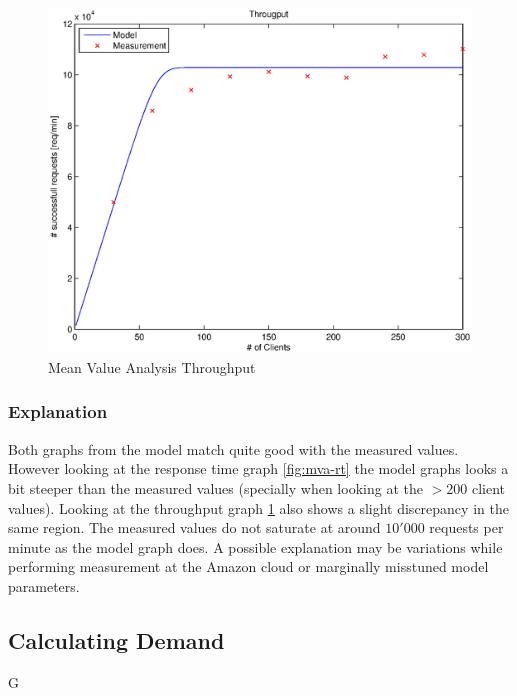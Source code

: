\documentclass[a4paper]{article}
\begin{document}
\begin{figure}[H]
	\begin{center}
    \includegraphics[scale=0.6]{../plots-ms2-mg/mva-tp.eps}
  \end{center}
  \caption{Mean Value Analysis Throughput}
  \label{fig:mva-tp}
\end{figure}



\subsubsection{Explanation}
Both graphs from the model match quite good with the measured values. However looking at the response time graph \ref{fig:mva-rt} the model graphs looks a bit steeper than the measured values (specially when looking at the $>200$ client values). Looking at the throughput graph \ref{fig:mva-tp} also shows a slight discrepancy in the same region. The measured values do not saturate at around $10'000$ requests per minute as the model graph does. A possible explanation may be variations while performing measurement at the Amazon cloud or marginally misstuned model parameters.


\subsection{Calculating Demand}

G


\end{document}

